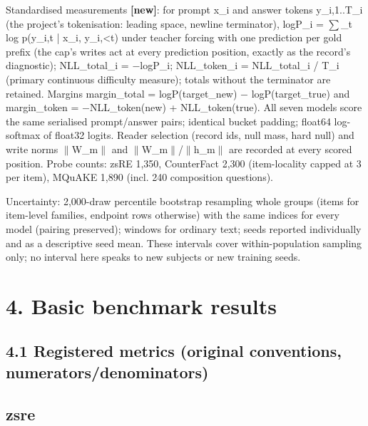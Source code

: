 \documentclass[10pt,a4paper]{article}
\begin{document}
Standardised measurements \textbf{[new]}: for prompt x\_i and answer tokens y\_i,1..T\_i (the project's tokenisation: leading space, newline terminator), logP\_i = $\sum$\_t log p(y\_i,t | x\_i, y\_i,<t) under teacher forcing with one prediction per gold prefix (the cap's writes act at every prediction position, exactly as the record's diagnostic); NLL\_total\_i = $-$logP\_i; NLL\_token\_i = NLL\_total\_i / T\_i (primary continuous difficulty measure); totals without the terminator are retained. Margins margin\_total = logP(target\_new) $-$ logP(target\_true) and margin\_token = $-$NLL\_token(new) + NLL\_token(true). All seven models score the same serialised prompt/answer pairs; identical bucket padding; float64 log-softmax of float32 logits. Reader selection (record ids, null mass, hard null) and write norms $\|$W\_m$\|$ and $\|$W\_m$\|$/$\|$h\_m$\|$ are recorded at every scored position. Probe counts: zsRE 1,350, CounterFact 2,300 (item-locality capped at 3 per item), MQuAKE 1,890 (incl. 240 composition questions).



Uncertainty: 2,000-draw percentile bootstrap resampling whole groups (items for item-level families, endpoint rows otherwise) with the same indices for every model (pairing preserved); windows for ordinary text; seeds reported individually and as a descriptive seed mean. These intervals cover within-population sampling only; no interval here speaks to new subjects or new training seeds.



\section*{4. Basic benchmark results}



\subsection*{4.1 Registered metrics (original conventions, numerators/denominators)}



\subsection*{zsre}
\end{document}
